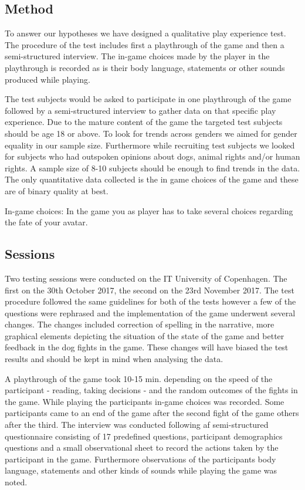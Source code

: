 \subsection{Method}
To answer our hypotheses we have designed a qualitative play experience test. The procedure of the test includes first a playthrough of the game and then a semi-structured interview. The in-game choices made by the player in the playthrough is recorded as is their body language, statements or other sounds produced while playing.

The test subjects would be asked to participate in one playthrough of the game followed by a semi-structured interview to gather data on that specific play experience. Due to the mature content of the game the targeted test subjects should be age 18 or above. To look for trends across genders we aimed for gender equality in our sample size. Furthermore while recruiting test subjects we looked for subjects who had outspoken opinions about dogs, animal rights and/or human rights. A sample size of 8-10 subjects should be enough to find trends in the data. The only quantitative data collected is the in game choices of the game and these are of binary quality at best. 

In-game choices:
In the game you as player has to take several choices regarding the fate of your avatar. 



\subsection{Sessions}
Two testing sessions were conducted on the IT University of Copenhagen. The first on the 30th October 2017, the second on the 23rd November 2017. The test procedure followed the same guidelines for both of the tests however a few of the questions were rephrased and the implementation of the game underwent several changes. The changes included correction of spelling in the narrative, more graphical elements depicting the situation of the state of the game and better feedback in the dog fights in the game. These changes will have biased the test results and should be kept in mind when analysing the data.

A playthrough of the game took 10-15 min. depending on the speed of the participant - reading, taking decisions - and the random outcomes of the fights in the game. While playing the participants in-game choices was recorded. Some participants came to an end of the game after the second fight of the game others after the third. 
The interview was conducted following af semi-structured questionnaire consisting of 17 predefined questions, participant demographics questions and a small observational sheet to record the actions taken by the participant in the game. Furthermore observations of the participants body language, statements and other kinds of sounds while playing the game was noted.

